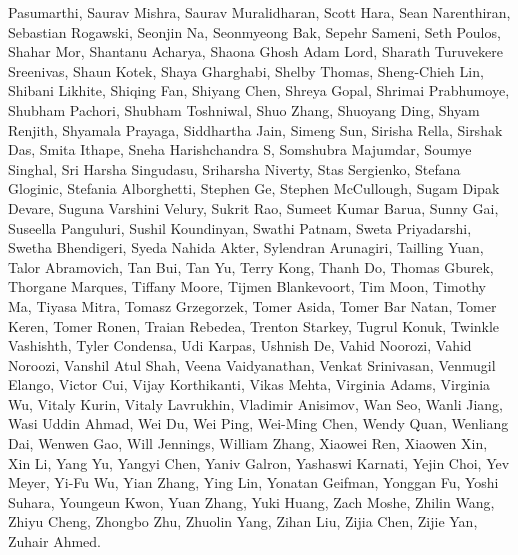 Pasumarthi, Saurav Mishra, Saurav Muralidharan, Scott Hara, Sean Narenthiran, Sebastian Rogawski, Seonjin Na, Seonmyeong Bak, Sepehr Sameni, Seth Poulos, Shahar Mor, Shantanu Acharya, Shaona Ghosh Adam Lord, Sharath Turuvekere Sreenivas, Shaun Kotek, Shaya Gharghabi, Shelby Thomas, Sheng-Chieh Lin, Shibani Likhite, Shiqing Fan, Shiyang Chen, Shreya Gopal, Shrimai Prabhumoye, Shubham Pachori, Shubham Toshniwal, Shuo Zhang, Shuoyang Ding, Shyam Renjith, Shyamala Prayaga, Siddhartha Jain, Simeng Sun, Sirisha Rella, Sirshak Das, Smita Ithape, Sneha Harishchandra S, Somshubra Majumdar, Soumye Singhal, Sri Harsha Singudasu, Sriharsha Niverty, Stas Sergienko, Stefana Gloginic, Stefania Alborghetti, Stephen Ge, Stephen McCullough, Sugam Dipak Devare, Suguna Varshini Velury, Sukrit Rao, Sumeet Kumar Barua, Sunny Gai, Suseella Panguluri, Sushil Koundinyan, Swathi Patnam, Sweta Priyadarshi, Swetha Bhendigeri, Syeda Nahida Akter, Sylendran Arunagiri, Tailling Yuan, Talor Abramovich, Tan Bui, Tan Yu, Terry Kong, Thanh Do, Thomas Gburek, Thorgane Marques, Tiffany Moore, Tijmen Blankevoort, Tim Moon, Timothy Ma, Tiyasa Mitra, Tomasz Grzegorzek, Tomer Asida, Tomer Bar Natan, Tomer Keren, Tomer Ronen, Traian Rebedea, Trenton Starkey, Tugrul Konuk, Twinkle Vashishth, Tyler Condensa, Udi Karpas, Ushnish De, Vahid Noorozi, Vahid Noroozi, Vanshil Atul Shah, Veena Vaidyanathan, Venkat Srinivasan, Venmugil Elango, Victor Cui, Vijay Korthikanti, Vikas Mehta, Virginia Adams, Virginia Wu, Vitaly Kurin, Vitaly Lavrukhin, Vladimir Anisimov, Wan Seo, Wanli Jiang, Wasi Uddin Ahmad, Wei Du, Wei Ping, Wei-Ming Chen, Wendy Quan, Wenliang Dai, Wenwen Gao, Will Jennings, William Zhang, Xiaowei Ren, Xiaowen Xin, Xin Li, Yang Yu, Yangyi Chen, Yaniv Galron, Yashaswi Karnati, Yejin Choi, Yev Meyer, Yi-Fu Wu, Yian Zhang, Ying Lin, Yonatan Geifman, Yonggan Fu, Yoshi Suhara, Youngeun Kwon, Yuan Zhang, Yuki Huang, Zach Moshe, Zhilin Wang, Zhiyu Cheng, Zhongbo Zhu, Zhuolin Yang, Zihan Liu, Zijia Chen, Zijie Yan, Zuhair Ahmed.
\newpage